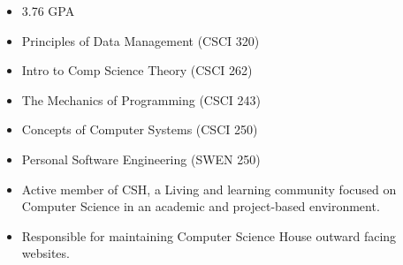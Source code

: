 \begin{itemize}
    \item 3.76 GPA
  \end{itemize}

\vspace{0.25cm}
\begin{itemize}
    \item Principles of Data Management (CSCI 320)
    \item Intro to Comp Science Theory (CSCI 262)
    \item The Mechanics of Programming (CSCI 243)
    \item Concepts of Computer Systems (CSCI 250)
    \item Personal Software Engineering (SWEN 250)
\end{itemize}

\vspace{0.25cm}

\vspace{0.25cm}

\smallskip
\newline

\vspace{0.25cm}

\begin{itemize}
    \item Active member of CSH, a Living and learning community focused on Computer Science in an academic and project-based environment.
  \end{itemize}

\begin{itemize}
  \item Responsible for maintaining Computer Science House outward facing websites.
\end{itemize}
